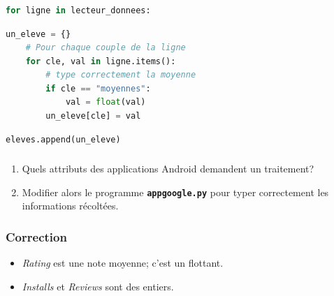 \documentclass[svgnames,11pt]{beamer}
\begin{document}
\begin{frame}[fragile]
    \frametitle{}

    \begin{center}
        \begin{lstlisting}[language=Python, xleftmargin=1em,xrightmargin=1em,basicstyle=\ttfamily\small]
for ligne in lecteur_donnees:
\end{lstlisting}
        \begin{lstlisting}[language=Python, xleftmargin=1em,xrightmargin=1em,basicstyle=\ttfamily\small]
    un_eleve = {}
    # Pour chaque couple de la ligne
    for cle, val in ligne.items():
        # type correctement la moyenne
        if cle == "moyennes":
            val = float(val)
        un_eleve[cle] = val
\end{lstlisting}
        \label{CODE}
        \begin{lstlisting}[language=Python, xleftmargin=1em,xrightmargin=1em,basicstyle=\ttfamily\small]
    eleves.append(un_eleve)
\end{lstlisting}
        \label{CODE}
    \end{center} 
\end{frame}
\begin{frame}
    \frametitle{}

    
    \begin{activite}
        \begin{enumerate}
            \item Quels attributs des applications Android demandent un traitement?
            \item  Modifier alors le programme \texttt{\textbf{appgoogle.py}} pour typer correctement les informations récoltées.
        \end{enumerate}
    \end{activite}

\end{frame}
\begin{frame}
    \frametitle{Correction}

    \begin{itemize}
        \item \emph{Rating} est une note moyenne; c'est un flottant.
        \item \emph{Installs} et \emph{Reviews} sont des entiers.
    \end{itemize}

\end{frame}
\end{document}
